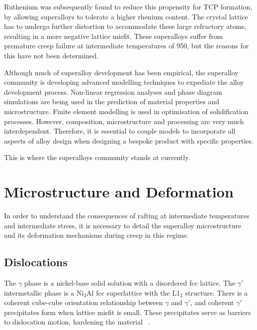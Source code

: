 Ruthenium was subsequently found to reduce this propensity for TCP formation, by allowing superalloys to tolerate a higher rhenium content. The crystal lattice has to undergo further distortion to accommodate these large refractory atoms, resulting in a more negative lattice misfit.  These superalloys suffer from premature creep failure at intermediate temperatures of 950\celsius, but the reasons for this have not been determined.

Although much of superalloy development has been empirical, the superalloy community is developing advanced modelling techniques to expediate the alloy development process.  Non-linear regression analyses and phase diagram simulations are being used in the prediction of material properties and microstructure. Finite element modelling is used in optimisation of solidification processes.  However, composition, microstructure and processing are very much interdependent. Therefore, it is essential to couple models to incorporate all aspects of alloy design when designing a bespoke product with specific properties.

This is where the superalloys community stands at currently.

\section{Microstructure and Deformation}

In order to understand the consequences of rafting at intermediate temperatures and intermediate stress, it is necessary to detail the superalloy microstructure and its deformation mechanisms during creep in this regime.

\subsection{Dislocations}

The $\gamma$ phase is a nickel-base solid solution with a disordered fcc lattice. The $\gamma'$ intermetallic phase is a Ni$_3$Al fcc superlattice with the L1$_2$ structure. There is a coherent cube-cube orientation  relationship between $\gamma$ and $\gamma'$, and coherent $\gamma'$ precipitates form when lattice misfit is small. These precipitates serve as barriers to dislocation motion, hardening the material ~\cite{copley67}. 

